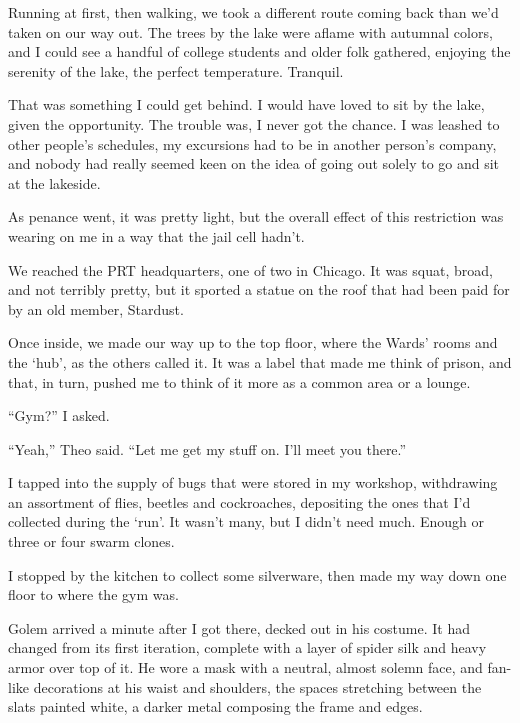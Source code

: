 Running at first, then walking, we took a different route coming back than we'd taken on our way out.  The trees by the lake were aflame with autumnal colors, and I could see a handful of college students and older folk gathered, enjoying the serenity of the lake, the perfect temperature.  Tranquil.



That was something I could get behind.  I would have loved to sit by the lake, given the opportunity.  The trouble was, I never got the chance.  I was leashed to other people's schedules, my excursions had to be in another person's company, and nobody had really seemed keen on the idea of going out solely to go and sit at the lakeside.



As penance went, it was pretty light, but the overall effect of this restriction was wearing on me in a way that the jail cell hadn't.



We reached the PRT headquarters, one of two in Chicago. It was squat, broad, and not terribly pretty, but it sported a statue on the roof that had been paid for by an old member, Stardust.



Once inside, we made our way up to the top floor, where the Wards' rooms and the `hub', as the others called it.  It was a label that made me think of prison, and that, in turn, pushed me to think of it more as a common area or a lounge.



``Gym?'' I asked.



``Yeah,'' Theo said.  ``Let me get my stuff on.  I'll meet you there.''



I tapped into the supply of bugs that were stored in my workshop, withdrawing an assortment of flies, beetles and cockroaches, depositing the ones that I'd collected during the `run'.  It wasn't many, but I didn't need much.  Enough or three or four swarm clones.



I stopped by the kitchen to collect some silverware, then made my way down one floor to where the gym was.



Golem arrived a minute after I got there, decked out in his costume.  It had changed from its first iteration, complete with a layer of spider silk and heavy armor over top of it.  He wore a mask with a neutral, almost solemn face, and fan-like decorations at his waist and shoulders, the spaces stretching between the slats painted white, a darker metal composing the frame and edges.



